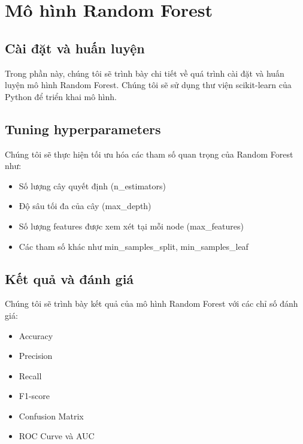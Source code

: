 \section{Mô hình Random Forest}

\subsection{Cài đặt và huấn luyện}
Trong phần này, chúng tôi sẽ trình bày chi tiết về quá trình cài đặt và huấn luyện mô hình Random Forest. Chúng tôi sẽ sử dụng thư viện scikit-learn của Python để triển khai mô hình.

\subsection{Tuning hyperparameters}
Chúng tôi sẽ thực hiện tối ưu hóa các tham số quan trọng của Random Forest như:
\begin{itemize}
    \item Số lượng cây quyết định (n\_estimators)
    \item Độ sâu tối đa của cây (max\_depth)
    \item Số lượng features được xem xét tại mỗi node (max\_features)
    \item Các tham số khác như min\_samples\_split, min\_samples\_leaf
\end{itemize}

\subsection{Kết quả và đánh giá}
Chúng tôi sẽ trình bày kết quả của mô hình Random Forest với các chỉ số đánh giá:
\begin{itemize}
    \item Accuracy
    \item Precision
    \item Recall
    \item F1-score
    \item Confusion Matrix
    \item ROC Curve và AUC
\end{itemize} 